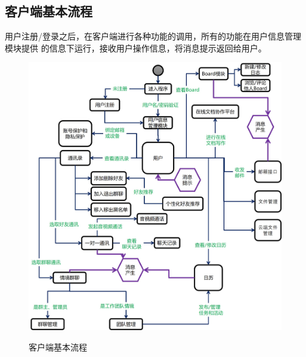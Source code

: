     \subsection{客户端基本流程}
        用户注册/登录之后，在客户端进行各种功能的调用，所有的功能在用户信息管理模块提供
        的信息下运行，接收用户操作信息，将消息提示返回给用户。
        \begin{figure}[ht]
            \centering
            \includegraphics[scale = 0.45]{OutlineDesign/figures/客户端基本流程.jpg}
            \label{tab:classification}
            \caption{客户端基本流程}
            \label{fig:noted-figure}
        \end{figure}
        \newpage
